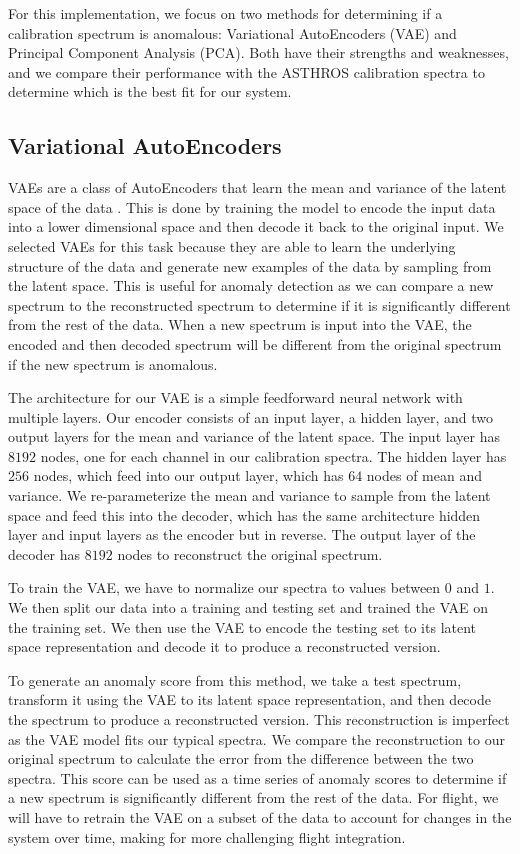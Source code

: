 For this implementation, we focus on two methods for determining if a calibration spectrum is anomalous: Variational AutoEncoders (VAE) and Principal Component Analysis (PCA).
Both have their strengths and weaknesses, and we compare their performance with the ASTHROS calibration spectra to determine which is the best fit for our system.

\subsection{Variational AutoEncoders}
VAEs are a class of AutoEncoders that learn the mean and variance of the latent space of the data \parencite{kingma2013auto}.
This is done by training the model to encode the input data into a lower dimensional space and then decode it back to the original input.
We selected VAEs for this task because they are able to learn the underlying structure of the data and generate new examples of the data by sampling from the latent space.
This is useful for anomaly detection as we can compare a new spectrum to the reconstructed spectrum to determine if it is significantly different from the rest of the data.
When a new spectrum is input into the VAE, the encoded and then decoded spectrum will be different from the original spectrum if the new spectrum is anomalous.

The architecture for our VAE is a simple feedforward neural network with multiple layers.
Our encoder consists of an input layer, a hidden layer, and two output layers for the mean and variance of the latent space.
The input layer has $8192$ nodes, one for each channel in our calibration spectra.
The hidden layer has $256$ nodes, which feed into our output layer, which has $64$ nodes of mean and variance.
We re-parameterize the mean and variance to sample from the latent space and feed this into the decoder, which has the same architecture hidden layer and input layers as the encoder but in reverse.
The output layer of the decoder has $8192$ nodes to reconstruct the original spectrum.

To train the VAE, we have to normalize our spectra to values between $0$ and $1$.
We then split our data into a training and testing set and trained the VAE on the training set.
We then use the VAE to encode the testing set to its latent space representation and decode it to produce a reconstructed version.

To generate an anomaly score from this method, we take a test spectrum, transform it using the VAE to its latent space representation, and then decode the spectrum to produce a reconstructed version.
This reconstruction is imperfect as the VAE model fits our typical spectra.
We compare the reconstruction to our original spectrum to calculate the error from the difference between the two spectra.
This score can be used as a time series of anomaly scores to determine if a new spectrum is significantly different from the rest of the data. 
For flight, we will have to retrain the VAE on a subset of the data to account for changes in the system over time, making for more challenging flight integration.

